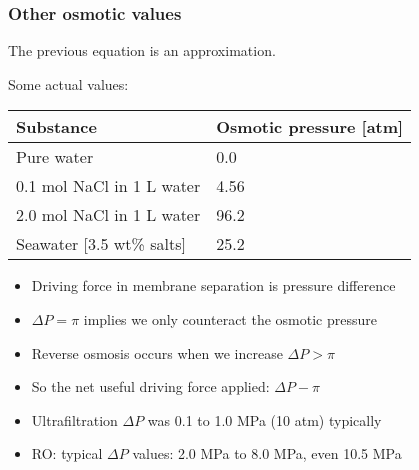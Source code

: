 \begin{frame}\frametitle{Other osmotic values}
	The previous equation is an approximation.

	\vspace{12pt}
	Some actual values:
	\begin{tabular}{ll}\\ \hline
	 	\textbf{Substance}  		& \textbf{Osmotic pressure [atm]} \\ \hline
		Pure water					& 0.0\\
		0.1 mol NaCl in 1 L water 	& 4.56\\
		2.0 mol NaCl in 1 L water	& 96.2\\
		Seawater [3.5 wt\% salts]	& 25.2\\
	\end{tabular}

	\begin{itemize}
		\item	Driving force in membrane separation is pressure difference
		\item	$\Delta P = \pi$ implies we only counteract the osmotic pressure
		\item	Reverse osmosis occurs when we increase $\Delta P > \pi$
		\item	So the net useful driving force applied: $\Delta P - \pi$
		\item	Ultrafiltration $\Delta P$ was 0.1 to 1.0 MPa (10 atm) typically
		\item	RO: typical $\Delta P$ values: 2.0 MPa to 8.0 MPa, even 10.5 MPa  %
	\end{itemize}
\end{frame}

